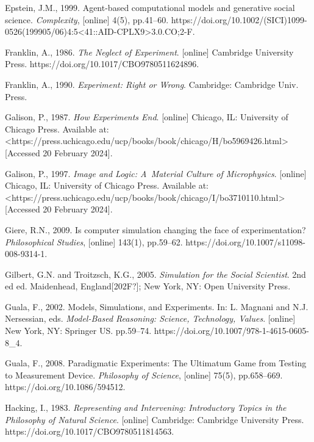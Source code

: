 Epstein, J.M., 1999. Agent-based computational models and generative social science. \textit{Complexity}, [online] 4(5), pp.41–60. https://doi.org/10.1002/(SICI)1099-0526(199905/06)4:5{\textless}41::AID-CPLX9{\textgreater}3.0.CO;2-F.



Franklin, A., 1986. \textit{The Neglect of Experiment}. [online] Cambridge University Press. https://doi.org/10.1017/CBO9780511624896.



Franklin, A., 1990. \textit{Experiment: Right or Wrong}. Cambridge: Cambridge Univ. Press.



Galison, P., 1987. \textit{How Experiments End}. [online] Chicago, IL: University of Chicago Press. Available at: {\textless}https://press.uchicago.edu/ucp/books/book/chicago/H/bo5969426.html{\textgreater} [Accessed 20 February 2024].



Galison, P., 1997. \textit{Image and Logic: A~Material Culture of Microphysics}. [online] Chicago, IL: University of Chicago Press. Available at: {\textless}https://press.uchicago.edu/ucp/books/book/chicago/I/bo3710110.html{\textgreater} [Accessed 20 February 2024].



Giere, R.N., 2009. Is computer simulation changing the face of experimentation? \textit{Philosophical Studies}, [online] 143(1), pp.59–62. https://doi.org/10.1007/s11098-008-9314-1.



Gilbert, G.N. and Troitzsch, K.G., 2005. \textit{Simulation for the Social Scientist}. 2nd ed ed. Maidenhead, England[202F?]; New York, NY: Open University Press.



Guala, F., 2002. Models, Simulations, and Experiments. In: L. Magnani and N.J. Nersessian, eds. \textit{Model-Based Reasoning: Science, Technology, Values}. [online] New York, NY: Springer US. pp.59–74. https://doi.org/10.1007/978-1-4615-0605-8\_4.



Guala, F., 2008. Paradigmatic Experiments: The Ultimatum Game from Testing to Measurement Device. \textit{Philosophy of Science}, [online] 75(5), pp.658–669. https://doi.org/10.1086/594512.



Hacking, I., 1983. \textit{Representing and Intervening: Introductory Topics in the Philosophy of Natural Science}. [online] Cambridge: Cambridge University Press. https://doi.org/10.1017/CBO9780511814563.



